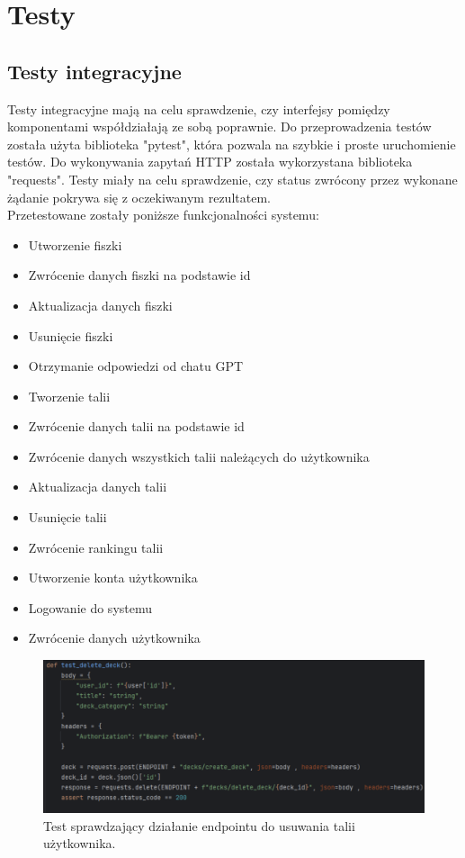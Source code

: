 \chapter{Testy}

\section{Testy integracyjne}

Testy integracyjne mają na celu sprawdzenie, czy interfejsy pomiędzy komponentami współdziałają ze sobą poprawnie.\cite{mielnikIntegrationTests} Do przeprowadzenia testów została użyta biblioteka "pytest", która pozwala na szybkie i proste uruchomienie testów. Do wykonywania zapytań HTTP została wykorzystana biblioteka "requests". Testy miały na celu sprawdzenie, czy status zwrócony przez wykonane żądanie pokrywa się z oczekiwanym rezultatem.\\
Przetestowane zostały poniższe funkcjonalności systemu:

\begin{itemize}
    \item Utworzenie fiszki
    \item Zwrócenie danych fiszki na podstawie id
    \item Aktualizacja danych fiszki
    \item Usunięcie fiszki
    \item Otrzymanie odpowiedzi od chatu GPT
    \item Tworzenie talii
    \item Zwrócenie danych talii na podstawie id
    \item Zwrócenie danych wszystkich talii należących do użytkownika
    \item Aktualizacja danych talii
    \item Usunięcie talii
    \item Zwrócenie rankingu talii
    \item Utworzenie konta użytkownika
    \item Logowanie do systemu
    \item Zwrócenie danych użytkownika
\end{itemize}

\begin{figure}[H]
    \centering
    \includegraphics[width=1\textwidth]{chapters/chapter_9/testy1}
    \caption{Test sprawdzający działanie endpointu do usuwania talii użytkownika.}
    \label{img:testy}
\end{figure}

